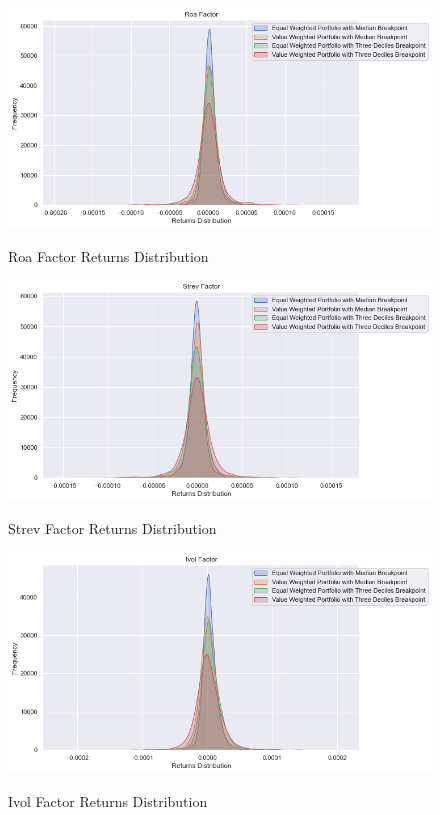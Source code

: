 \begin{figure}[H]
	\caption{Roa Factor Returns Distribution}
	\centering
	\includegraphics[scale=.63]{../../output/figures/roa.png}
	\label{fig:roa}
\end{figure}

\begin{figure}[H]
	\caption{Strev Factor Returns Distribution}
	\centering
	\includegraphics[scale=.63]{../../output/figures/strev.png}
	\label{fig:strev}
\end{figure}

\begin{figure}[H]
	\caption{Ivol Factor Returns Distribution}
	\centering
	\includegraphics[scale=.63]{../../output/figures/ivol.png}
	\label{fig:ivol}
\end{figure}

